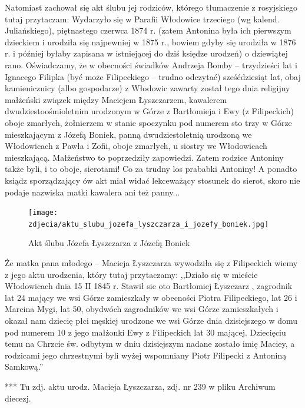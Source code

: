Natomiast zachował się akt ślubu jej rodziców, którego tłumaczenie z rosyjskiego tutaj przytaczam: Wydarzyło się w Parafii Włodowice trzeciego (wg kalend. Juliańskiego), piętnastego czerwca 1874 r. (zatem Antonina była ich pierwszym dzieckiem i urodziła się najpewniej w 1875 r., bowiem gdyby się urodziła w 1876 r. i później byłaby zapisana w istniejącej do dziś księdze urodzeń) o dziewiątej rano. Oświadczamy, że w obecności świadków Andrzeja Bomby -- trzydzieści lat i Ignacego Filipka (być może Filipeckiego -- trudno odczytać) sześćdziesiąt lat, obaj kamienicznicy (albo gospodarze) z Włodowic zawarty został tego dnia religijny małżeński związek między Maciejem Łyszczarzem, kawalerem dwudziestoośmioletnim urodzonym w Górze z Bartłomieja i Ewy (z Filipeckich) oboje zmarłych, żołnierzem w stanie spoczynku pod numerem sto trzy w Górze mieszkającym z Józefą Boniek, panną dwudziestoletnią urodzoną we Włodowicach z Pawła i Zofii, oboje zmarłych, u siostry we Włodowicach mieszkającą. Małżeństwo to poprzedziły zapowiedzi. Zatem rodzice Antoniny także byli, i to oboje, sierotami! Co za trudny los prababki Antoniny! A ponadto ksiądz sporządzający ów akt miał widać lekceważący stosunek do sierot, skoro nie podaje nazwiska matki kawalera ani też panny...

\begin{figure}[!h]
\begin{center}
\texttt{[image: zdjecia/aktu\_slubu\_jozefa\_lyszczarza\_i\_jozefy\_boniek.jpg]}
\caption[Akt ślubu Józefa Łyszczarza z Józefą Boniek]{Akt ślubu Józefa Łyszczarza z Józefą Boniek}
\label{rys:akt_slubu_jozefa_lyszczarza_i_jozefy_boniek}
\end{center}
\end{figure}

Że matka pana młodego -- Macieja Łyszczarza wywodziła się z Filipeckich wiemy z jego aktu urodzenia, który tutaj przytaczamy: ,,Działo się w mieście Włodowicach dnia 15 II 1845 r. Stawił sie oto Bartłomiej Łyszczarz , zagrodnik lat 24 mający we wsi Górze zamieszkały w obecności Piotra Filipeckiego, lat 26 i Marcina Mygi, lat 50, obydwóch zagrodników we wsi Górze zamieszkałych i okazał nam dziecię płci męskiej urodzone we wsi Górze dnia dzisiejszego w domu pod numerem 10 z jego małżonki Ewy z Filipeckich lat 30 mającej. Dziecięciu temu na Chrzcie św. odbytym w dniu dzisiejszym nadane zostało imię Maciey, a rodzicami jego chrzestnymi byli wyżej wspomniany Piotr Filipecki z Antoniną Samkową.''

{\color{red}
*** Tu zdj. aktu urodz. Macieja Łyszczarza, zdj. nr 239 w pliku Archiwum diecezj.}

